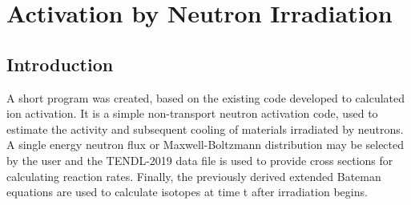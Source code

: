 
\section{Activation by Neutron Irradiation}

\subsection{Introduction}

A short program was created, based on the existing code developed to calculated ion activation.  It is a simple non-transport neutron activation code, used to estimate the activity and subsequent cooling of materials irradiated by neutrons.  A single energy neutron flux or Maxwell-Boltzmann distribution may be selected by the user and the TENDL-2019 data file is used to provide cross sections for calculating reaction rates.  Finally, the previously derived extended Bateman equations are used to calculate isotopes at time t after irradiation begins.



















